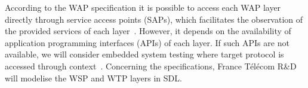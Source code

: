 According to the WAP specification it is possible to
access each WAP layer directly through service access points (SAPs),
which facilitates the observation of the provided services of each
layer~\cite{wapforum}. However, it depends on the
availability of application programming interfaces (APIs) of each
layer. If such APIs are not available, we will consider embedded
system testing where target protocol is accessed through
context~\cite{hit}. Concerning the specifications, France Télécom R\&D
will modelise the WSP and WTP layers in SDL.


